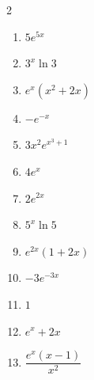 \documentclass[11pt]{article}
\begin{document}
\begin{keybox}
\begin{multicols}{2}
\small
\begin{enumerate}[leftmargin=*,itemsep=3pt]
  \item $5e^{5x}$
  \item $3^x\ln 3$
  \item $e^x(x^2+2x)$
  \item $-e^{-x}$
  \item $3x^2 e^{x^3+1}$
  \item $4e^x$
  \item $2e^{2x}$
  \item $5^x\ln 5$
  \item $e^{2x}(1+2x)$
  \item $-3e^{-3x}$
  \item $1$
  \item $e^x+2x$
  \item $\dfrac{e^x(x-1)}{x^2}$
\end{enumerate}
\end{multicols}
\end{keybox}
\end{document}
